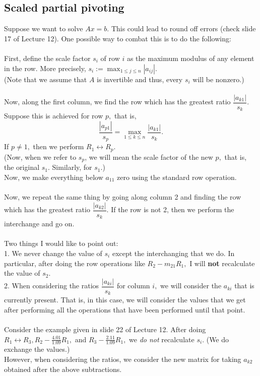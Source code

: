 \documentclass{article}
\begin{document}
\subsection{Scaled partial pivoting}
Suppose we want to solve $Ax = b.$ This could lead to round off errors (check slide 17 of Lecture 12). One possible way to combat this is to do the following:\\~\\
First, define the scale factor $s_i$ of row $i$ as the maximum modulus of any element in the row. More precisely, $s_i := \displaystyle\max_{1 \le j \le n} |a_{ij}|.$\\
(Note that we assume that $A$ is invertible and thus, every $s_i$ will be nonzero.)\\~\\
Now, along the first column, we find the row which has the greatest ratio $\dfrac{|a_{k1}|}{s_k}.$ Suppose this is achieved for row $p,$ that is,
\[\frac{|a_{p1}|}{s_p} = \max_{1 \le k \le n}\frac{|a_{k1}|}{s_k}.\]
If $p \neq 1,$ then we perform $R_1 \leftrightarrow R_p.$\\
(Now, when we refer to $s_p$, we will mean the scale factor of the new $p,$ that is, the original $s_1.$ Similarly, for $s_1.$)\\
Now, we make everything below $a_{11}$ zero using the standard row operation.\\~\\
Now, we repeat the same thing by going along column 2 and finding the row which has the greatest ratio $\dfrac{|a_{k2}|}{s_k}.$ If the row is not 2, then we perform the interchange and go on.\\~\\
Two things I would like to point out:\\
1. We never change the value of $s_i$ except the interchanging that we do. In particular, after doing the row operations like $R_2 - m_{21}R_1,$ I will \textbf{not} recalculate the value of $s_2.$\\
2. When considering the ratios $\dfrac{|a_{ki}|}{s_k}$ for column $i,$ we will consider the $a_{ki}$ that is currently present. That is, in this case, we will consider the values that we get after performing all the operations that have been performed until that point.\\~\\
Consider the example given in slide 22 of Lecture 12. After doing $R_1 \leftrightarrow R_3, R_2 - \frac{4.01}{1.09}R_1,$ and $R_3 - \frac{2.11}{1.09}R_1,$ we \emph{do not} recalculate $s_i.$ (We do exchange the values.)\\
However, when considering the ratios, we consider the new matrix for taking $a_{k2}$ obtained after the above subtractions.
\end{document}
